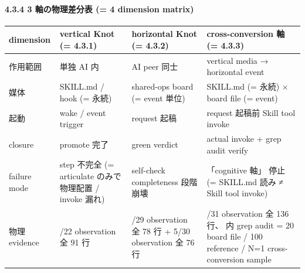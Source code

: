 \documentclass[
]{article}
\newcounter{none} %
\begin{document}
\paragraph{4.3.4 3 軸の物理差分表 (= 4 dimension
matrix)}\label{ux8ef8ux306eux7269ux7406ux5deeux5206ux8868-4-dimension-matrix}

{\def\LTcaptype{none} %
\begin{longtable}[]{@{}
  >{\raggedright\arraybackslash}p{}
  >{\raggedright\arraybackslash}p{}
  >{\raggedright\arraybackslash}p{}
  >{\raggedright\arraybackslash}p{}@{}}
\toprule\noalign{}
\begin{minipage}[b]{\linewidth}\raggedright
dimension
\end{minipage} & \begin{minipage}[b]{\linewidth}\raggedright
vertical Knot (= 4.3.1)
\end{minipage} & \begin{minipage}[b]{\linewidth}\raggedright
horizontal Knot (= 4.3.2)
\end{minipage} & \begin{minipage}[b]{\linewidth}\raggedright
cross-conversion 軸 (= 4.3.3)
\end{minipage} \\
\midrule\noalign{}
\endhead
\bottomrule\noalign{}
\endlastfoot
作用範囲 & 単独 AI 内 & AI peer 同士 & vertical media → horizontal
event \\
媒体 & SKILL.md / hook (= 永続) & shared-ops board (= event 単位) &
SKILL.md (= 永続) × board file (= event) \\
起動 & wake / event trigger & request 起稿 & request 起稿前 Skill tool
invoke \\
closure & promote 完了 & green verdict & actual invoke + grep audit
verify \\
failure mode & 3 step 不完全 (= articulate のみで物理配置 / invoke 漏れ)
& self-check completeness 段階崩壊 & 「cognitive 軸」 停止 (= SKILL.md
読み ≠ Skill tool invoke) \\
物理 evidence & 5/22 observation 全 91 行 & 5/29 observation 全 78 行 +
5/30 observation 全 76 行 & 5/31 observation 全 136 行、 内 grep audit =
20 board file / 100 reference / N=1 cross-conversion sample \\
\end{longtable}
}
\end{document}
